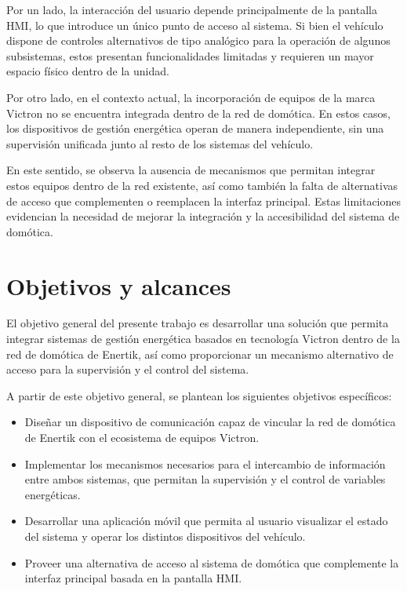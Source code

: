 Por un lado, la interacción del usuario depende principalmente de la pantalla HMI, lo que introduce un único punto de acceso al sistema. Si bien el vehículo dispone de controles alternativos de tipo analógico para la operación de algunos subsistemas, estos presentan funcionalidades limitadas y requieren un mayor espacio físico dentro de la unidad.

Por otro lado, en el contexto actual, la incorporación de equipos de la marca Victron no se encuentra integrada dentro de la red de domótica. En estos casos, los dispositivos de gestión energética operan de manera independiente, sin una supervisión unificada junto al resto de los sistemas del vehículo.

En este sentido, se observa la ausencia de mecanismos que permitan integrar estos equipos dentro de la red existente, así como también la falta de alternativas de acceso que complementen o reemplacen la interfaz principal. Estas limitaciones evidencian la necesidad de mejorar la integración y la accesibilidad del sistema de domótica.


\section{Objetivos y alcances}
\label{sec:1_4}

El objetivo general del presente trabajo es desarrollar una solución que permita integrar sistemas de gestión energética basados en tecnología Victron dentro de la red de domótica de Enertik, así como proporcionar un mecanismo alternativo de acceso para la supervisión y el control del sistema.

A partir de este objetivo general, se plantean los siguientes objetivos específicos:

\begin{itemize}
    \item Diseñar un dispositivo de comunicación capaz de vincular la red de domótica de Enertik con el ecosistema de equipos Victron.
    
    \item Implementar los mecanismos necesarios para el intercambio de información entre ambos sistemas, que permitan la supervisión y el control de variables energéticas.
    
    \item Desarrollar una aplicación móvil que permita al usuario visualizar el estado del sistema y operar los distintos dispositivos del vehículo.
    
    \item Proveer una alternativa de acceso al sistema de domótica que complemente la interfaz principal basada en la pantalla HMI.
\end{itemize}

